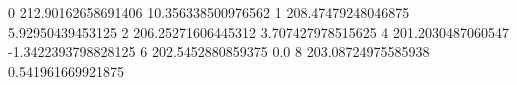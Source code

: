 0 212.90162658691406 10.356338500976562
1 208.47479248046875 5.92950439453125
2 206.25271606445312 3.707427978515625
4 201.2030487060547 -1.3422393798828125
6 202.5452880859375 0.0
8 203.08724975585938 0.541961669921875
